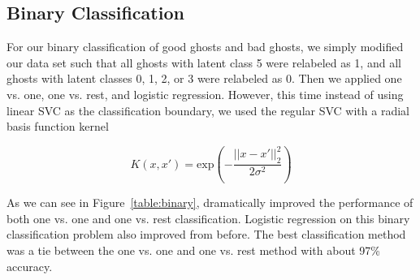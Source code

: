 \documentclass[11pt]{amsart}
\begin{document}
\subsection{Binary Classification}

For our binary classification of good ghosts and bad ghosts, we simply modified our data set such that all ghosts with latent class 5 were relabeled as 1, and all ghosts with latent classes 0, 1, 2, or 3 were relabeled as 0. Then we applied one vs. one, one vs. rest, and logistic regression. However, this time instead of using linear SVC as the classification boundary, we used the regular SVC with a radial basis function kernel

$$ K(x,x') = \text{exp}\left(-\frac{|| x - x' ||_2^2}{2\sigma^2}\right) $$

As we can see in Figure~\ref{table:binary}, dramatically improved the performance of both one vs. one and one vs. rest classification. Logistic regression on this binary classification problem also improved from before. The best classification method was a tie between the one vs. one and one vs. rest method with about 97\% accuracy.
\end{document}
